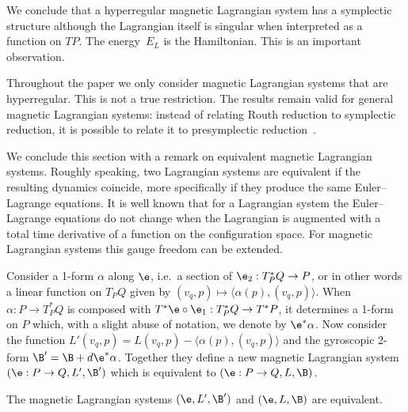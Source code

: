 We conclude that a hyperregular magnetic Lagrangian system has a symplectic structure although the Lagrangian itself is singular when interpreted as a function on $TP$. The energy~$E_L$ is the Hamiltonian. This is an important observation.

\begin{remark} Throughout the paper we only consider magnetic Lagrangian systems that are hyperregular. This is not a true restriction. The results remain valid for general magnetic Lagrangian systems: instead of relating Routh reduction to symplectic reduction, it is possible to relate it to presymplectic reduction~\cite{presympred}. \end{remark}

\begin{remark} We conclude this section with a remark on equivalent magnetic Lagrangian systems. Roughly speaking, two Lagrangian systems are equivalent if the resulting dynamics coincide, more specif\/ically if they produce the same Euler--Lagrange equations. It is well known that for a Lagrangian system the Euler--Lagrange equations do not change when the Lagrangian is augmented with a total time derivative of a function on the conf\/iguration space. For magnetic Lagrangian systems this gauge freedom can be extended.

Consider a 1-form $\alpha$ along $\e$, i.e.\ a section of $\e_2:T^*_PQ\to P$, or in other words a linear function on $T_PQ$ given by $(v_q,p)\mapsto \langle \alpha(p),(v_q,p)\rangle$. When $\alpha:P\to T^*_PQ$ is composed with $T^*\e\circ\e_1:T^*_PQ\to T^*P$, it determines a 1-form on $P$ which, with a slight abuse of notation, we denote by $\e^*\alpha$. Now consider the function $L'(v_q,p)= L(v_q,p)- \langle \alpha(p),(v_q,p)\rangle$ and the gyroscopic 2-form $\B'= \B +d\e^*\alpha$.  Together they def\/ine a new magnetic Lagrangian system $(\e:P\to Q, L',\B ')$ which is equivalent to $(\e:P\to Q,L,\B)$.
\end{remark}

\begin{lemma}
 The magnetic Lagrangian systems $(\e, L',\B ')$ and $(\e,L,\B)$ are equivalent.
\end{lemma}

